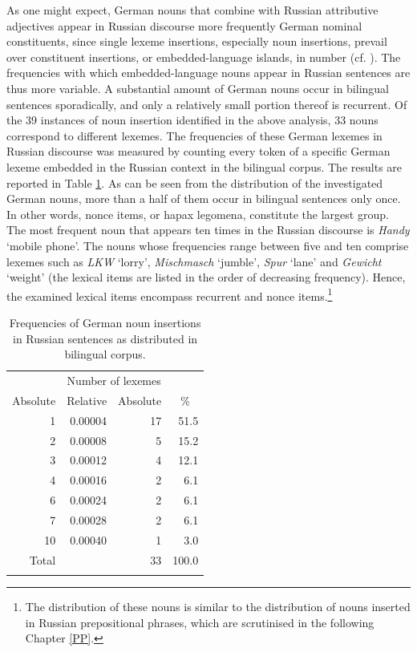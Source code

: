 As one might expect, German nouns that combine with Russian attributive adjectives appear in Russian discourse more frequently German nominal constituents, since single lexeme insertions, especially noun insertions, prevail over constituent insertions, or embedded-language islands, in number (cf. ). The frequencies with which embedded-language nouns appear in Russian sentences are thus more variable. A substantial amount of German nouns occur in bilingual sentences sporadically, and only a relatively small portion thereof is recurrent. Of the 39 instances of noun insertion identified in the above analysis, 33 nouns correspond to different lexemes. The frequencies of these German lexemes in Russian discourse was measured by counting every token of a specific German lexeme embedded in the Russian context in the bilingual corpus. The results are reported in Table \ref{tab:4:3}. As can be seen from the distribution of the investigated German nouns, more than a half of them occur in bilingual sentences only once. In other words, nonce items, or hapax legomena, constitute the largest group. The most frequent noun that appears ten times in the Russian discourse is \textit{Handy} `mobile phone'. The nouns whose frequencies range between five and ten comprise lexemes such as \textit{LKW} `lorry', \textit{Mischmasch} `jumble', \textit{Spur} `lane' and \textit{Gewicht} `weight' (the lexical items are listed in the order of decreasing frequency). Hence, the examined lexical items encompass recurrent and nonce items.\footnote{The distribution of these nouns is similar to the distribution of nouns inserted in Russian prepositional phrases, which are scrutinised in the following Chapter \ref{PP}.}

\begin{table}
\begin{tabular}{rrrr}
\lsptoprule
        \multicolumn{2}{c}{Word frequency} & \multicolumn{2}{c}{Number of lexemes}\\\cmidrule(lr){1-2}\cmidrule(lr){3-4}
		\multicolumn{1}{c}{Absolute} & \multicolumn{1}{c}{Relative} & \multicolumn{1}{c}{Absolute} & \multicolumn{1}{c}{\%} \\\midrule
		1	& 0.00004	& 17	& 51.5\\
		2	& 0.00008	& 5	& 15.2\\
		3	& 0.00012	& 4	& 12.1\\
		4	& 0.00016	& 2	& 6.1\\
		6	& 0.00024	& 2	& 6.1\\
		7	& 0.00028	& 2	& 6.1\\
		10	& 0.00040	& 1	& 3.0\\
         Total	& 	& 33	& 100.0\\  
	\lspbottomrule
\end{tabular}
	\caption{Frequencies of German noun insertions in Russian sentences as distributed in bilingual corpus.}\label{tab:4:3}
\end{table}

